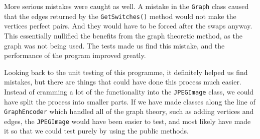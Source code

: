 More serious mistakes were caught as well. A mistake in the \lstinline|Graph| class caused that the edges returned by the \lstinline|GetSwitches()| method would not make the vertices perfect pairs. And they would have to be forced after the swaps anyway. This essentially nullified the benefits from the graph theoretic method, as the graph was not being used. The tests made us find this mistake, and the performance of the program improved greatly.

Looking back to the unit testing of this programme, it definitely helped us find mistakes, but there are things that could have done this process much easier. Instead of cramming a lot of the functionality into the \lstinline|JPEGImage| class, we could have split the process into smaller parts. If we have made classes along the line of \lstinline|GraphEncoder| which handled all of the graph theory, such as adding vertices and edges, the \lstinline|JPEGImage| would have been easier to test, and most likely have made it so that we could test purely by using the public methods. 